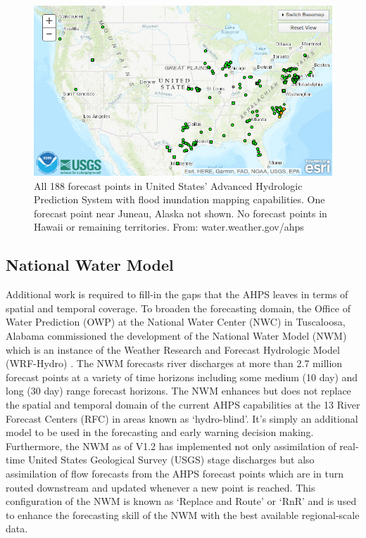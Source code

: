 %
\begin{figure}[h!]
\centering
\includegraphics[scale=2.0]{figures/ahps_fim_forecast_points_conus.jpg}
\caption{All 188 forecast points in United States' Advanced Hydrologic Prediction System with flood inundation mapping capabilities. One forecast point near Juneau, Alaska not shown. No forecast points in Hawaii or remaining territories. From: water.weather.gov/ahps}
\label{fig:fim_ahps_points}
\end{figure}
%
\subsection{National Water Model}
%
Additional work is required to fill-in the gaps that the AHPS leaves in terms of spatial and temporal coverage.
To broaden the forecasting domain, the Office of Water Prediction (OWP) at the National Water Center (NWC) in Tuscaloosa, Alabama commissioned the development of the National Water Model (NWM) which is an instance of the Weather Research and Forecast Hydrologic Model (WRF-Hydro) \cite{gochis2018wrf,cosgrove2019evolution}. 
The NWM forecasts river discharges at more than 2.7 million forecast points at a variety of time horizons including some medium (10 day) and long (30 day) range forecast horizons.
The NWM enhances but does not replace the spatial and temporal domain of the current AHPS capabilities at the 13 River Forecast Centers (RFC) in areas known as `hydro-blind'. 
It's simply an additional model to be used in the forecasting and early warning decision making.
Furthermore, the NWM as of V1.2 has implemented not only assimilation of real-time United States Geological Survey (USGS) stage discharges but also assimilation of flow forecasts from the AHPS forecast points which are in turn routed downstream and updated whenever a new point is reached. 
This configuration of the NWM is known as `Replace and Route' or `RnR' and is used to enhance the forecasting skill of the NWM with the best available regional-scale data.

